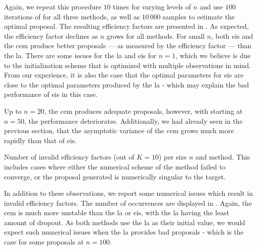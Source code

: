 Again, we repeat this procedure $10$ times for varying levels of $n$ and use $100$ iterations of for all three methods, as well as $10\,000$ samples to estimate the optimal proposal.
The resulting efficiency factors are presented in . As expected, the efficiency factor declines as $n$ grows for all methods. For small $n$, both \acrshort{eis} and the \acrshort{cem} produce better proposals --- as measured by the efficiency factor --- than the \acrshort{la}. There are some issues for the \acrshort{la} and \acrshort{eis} for $n=1$, which we believe is due to the initialization scheme that is optimized with multiple observations in mind. From our experience, it is also the case that the optimal parameters for \acrshort{eis} are close to the optimal parameters produced by the \acrshort{la} - which may explain the bad performance of \acrshort{eis} in this case. 

Up to $n=20$, the \acrshort{cem} produces adequate proposals, however, with starting at $n=50$, the performance deteriorates. Additionally, we had already seen in the previous section, that the asymptotic variance of the \acrshort{cem} grows much more rapidly than that of \acrshort{eis}. 

\begin{table}
    \centering
    
    \label{tab:ssm_comparison_missing_values}
    \caption{Number of invalid efficiency factors (out of $K=10$) per size $n$ and method. This includes cases where either the numerical scheme of the method failed to converge, or the proposal generated is numerically singular to the target.}
\end{table}

In addition to these observations, we report some numerical issues which result in invalid efficiency factors. The number of occurrences are displayed in . Again, the \acrshort{cem} is much more unstable than the \acrshort{la} or \acrshort{eis}, with the \acrshort{la} having the least amount of dropout. As both methods use the \acrshort{la} as their initial value, we would expect such numerical issues when the \acrshort{la} provides bad proposals - which is the case for some proposals at $n=100$.